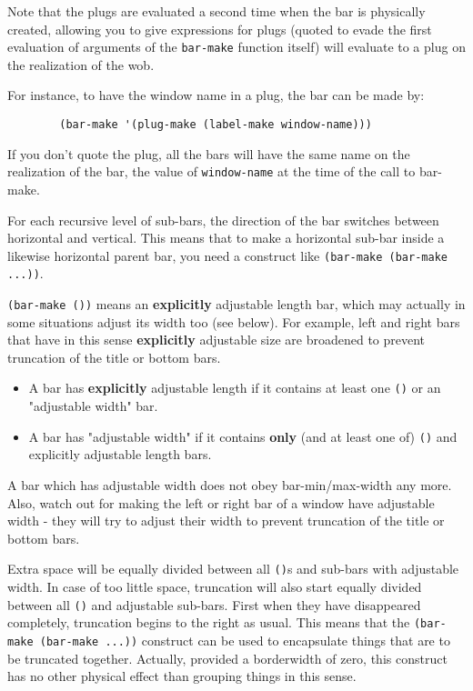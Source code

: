 Note that the plugs are evaluated a second time when the bar is physically
created, allowing you to give expressions for plugs (quoted to evade the
first evaluation of arguments of the \verb"bar-make" function itself)
will evaluate to a plug on the realization of the wob.  

For instance, to have the window name in a plug, the bar can be made by:
{\exemplefont\begin{verbatim}
        (bar-make '(plug-make (label-make window-name)))
\end{verbatim}}
If you don't quote the plug, all the bars will have the same name on the
realization of the bar, the value of \verb"window-name" at the time of the
call to bar-make.

For each recursive level of sub-bars, the direction of the bar switches
between horizontal and vertical. This means that to make a horizontal
sub-bar inside a likewise horizontal parent bar, you need a construct like
\verb|(bar-make (bar-make ...))|.

\verb|(bar-make ())| means an {\bf explicitly}
     adjustable length bar, which may actually in some situations adjust its
     width too (see below). For example, left and right bars that have in this
     sense {\bf explicitly} adjustable size are broadened to prevent
     truncation of the title or bottom bars. 
\begin{itemize}	
\item  A bar has {\bf explicitly} adjustable length if it contains at least
     one \verb|()| or an "adjustable width" bar.
\item A bar has "adjustable width" if it contains {\bf only} (and at least
     one of) \verb|()| and explicitly adjustable length bars. 
\end{itemize} 
   A bar which has adjustable width does not obey bar-min/max-width
   any more. 
   Also, watch out for making the left or right bar of a window have
   adjustable width - they will try to adjust their width to prevent
   truncation of the title or bottom bars. 

Extra space will be equally divided between all \verb|()|s and sub-bars
   with adjustable width. In case of too little space, truncation will
   also start equally divided between all \verb|()| and adjustable sub-bars.
   First when they have disappeared completely, truncation begins to
   the right as usual.
   This means that the \verb|(bar-make (bar-make ...))| construct can be
   used to encapsulate things that are to be truncated
   together. Actually, provided a borderwidth of zero, this construct
   has no other physical effect than grouping things in this sense.


